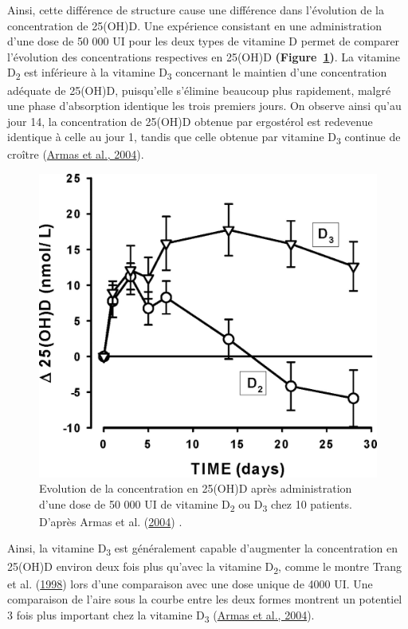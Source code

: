 \documentclass[
  a4paper,
  DIV=11,
  numbers=noendperiod,
  listof=totoc]{scrreprt}
\begin{document}
Ainsi, cette différence de structure cause une différence dans
l'évolution de la concentration de 25(OH)D. Une expérience consistant en
une administration d'une dose de 50 000 UI pour les deux types de
vitamine D permet de comparer l'évolution des concentrations respectives
en 25(OH)D \textbf{(Figure~\ref{fig-PK-VD})}. La vitamine
D\textsubscript{2} est inférieure à la vitamine D\textsubscript{3}
concernant le maintien d'une concentration adéquate de 25(OH)D,
puisqu'elle s'élimine beaucoup plus rapidement, malgré une phase
d'absorption identique les trois premiers jours. On observe ainsi qu'au
jour 14, la concentration de 25(OH)D obtenue par ergostérol est
redevenue identique à celle au jour 1, tandis que celle obtenue par
vitamine D\textsubscript{3} continue de croître
(\protect\hyperlink{ref-Armas.2004}{Armas et al., 2004}).

\begin{figure}

{\centering \includegraphics{figures/PK_D2_vs_D3.jpeg}

}

\caption{\label{fig-PK-VD}Evolution de la concentration en 25(OH)D après
administration d'une dose de 50 000 UI de vitamine D\textsubscript{2} ou
D\textsubscript{3} chez 10 patients. D'après Armas et al.
(\protect\hyperlink{ref-Armas.2004}{2004}) .}

\end{figure}

Ainsi, la vitamine D\textsubscript{3} est généralement capable
d'augmenter la concentration en 25(OH)D environ deux fois plus qu'avec
la vitamine D\textsubscript{2}, comme le montre Trang et al.
(\protect\hyperlink{ref-Trang.1998}{1998}) lors d'une comparaison avec
une dose unique de 4000 UI. Une comparaison de l'aire sous la courbe
entre les deux formes montrent un potentiel 3 fois plus important chez
la vitamine D\textsubscript{3} (\protect\hyperlink{ref-Armas.2004}{Armas
et al., 2004}).
\end{document}
